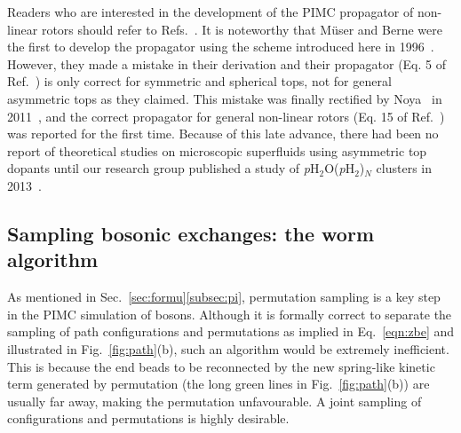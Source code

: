 \documentclass[12pt]{iopart}
\newcommand{\pwater}{{\em p}H$_2$O}
\newcommand{\phtwo}{{\em p}H$_2$}
\begin{document}
Readers who are interested in the development of the PIMC propagator of non-linear rotors should refer to Refs.~\cite{rossky_semi_class1,rossky_semi_class2,marx_muser_rot_pimc,muser_berne_rotden,blinov_RCF,noya_rotden,noya_molphys}. 
It is noteworthy that  M\"user and Berne were the first to develop the propagator using the scheme introduced here in 1996~\cite{muser_berne_rotden}. 
However, they made a mistake in their derivation and their propagator (Eq. 5 of Ref.~\cite{muser_berne_rotden}) is only correct for symmetric and spherical tops, 
not for general asymmetric tops as they claimed. 
This mistake was finally rectified by Noya \etal~in 2011~\cite{noya_rotden}, and the correct propagator for general non-linear rotors (Eq. 15 of Ref.~\cite{noya_rotden}) was reported for the first time. 
Because of this late advance, there had been no report of theoretical studies on microscopic superfluids using asymmetric top dopants until our research group published a study of \pwater(\phtwo)$_N$ clusters in 2013~\cite{tobywater}.

\subsection{Sampling bosonic exchanges: the worm algorithm} \label{subsec:worm}

As mentioned in Sec.~\ref{sec:formu}\ref{subsec:pi}, permutation sampling is a key step in the PIMC simulation of bosons. 
Although it is formally correct to separate the sampling of path configurations and permutations as implied in Eq.~\ref{eqn:zbe} and illustrated in Fig.~\ref{fig:path}(b), such an algorithm would be extremely inefficient. 
This is because the end beads to be reconnected by the new spring-like kinetic term generated by permutation (the long green lines in Fig.~\ref{fig:path}(b)) are usually far away, making the permutation unfavourable. A joint sampling of configurations and permutations is highly desirable.
\end{document}
